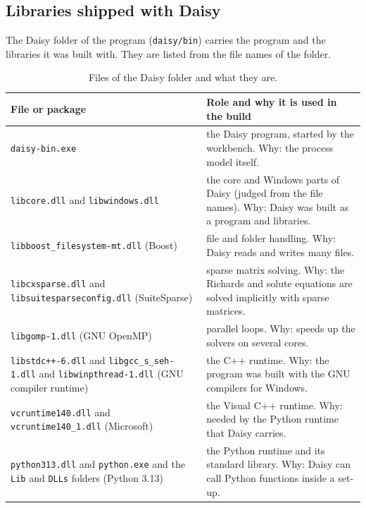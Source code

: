 \subsection{Libraries shipped with Daisy}
The Daisy folder of the program (\texttt{daisy/bin}) carries the program and the libraries it was built with. They are listed from the file names of the folder.
\begin{table}[H]\centering\small
\caption{Files of the Daisy folder and what they are.}\label{tab:daisydll}
\begin{tabular}{@{}>{\raggedright\arraybackslash}p{4.2cm}>{\raggedright\arraybackslash}p{8.8cm}@{}}
\toprule File or package & Role and why it is used in the build\\\midrule
\texttt{daisy-bin.exe} & the Daisy program, started by the workbench. Why: the process model itself.\\
\texttt{libcore.dll} and \texttt{libwindows.dll} & the core and Windows parts of Daisy (judged from the file names). Why: Daisy was built as a program and libraries.\\
\texttt{libboost\_filesystem-mt.dll} (Boost) & file and folder handling. Why: Daisy reads and writes many files.\\
\texttt{libcxsparse.dll} and \texttt{libsuitesparseconfig.dll} (SuiteSparse) & sparse matrix solving. Why: the Richards and solute equations are solved implicitly with sparse matrices.\\
\texttt{libgomp-1.dll} (GNU OpenMP) & parallel loops. Why: speeds up the solvers on several cores.\\
\texttt{libstdc++-6.dll} and \texttt{libgcc\_s\_seh-1.dll} and \texttt{libwinpthread-1.dll} (GNU compiler runtime) & the C++ runtime. Why: the program was built with the GNU compilers for Windows.\\
\texttt{vcruntime140.dll} and \texttt{vcruntime140\_1.dll} (Microsoft) & the Visual C++ runtime. Why: needed by the Python runtime that Daisy carries.\\
\texttt{python313.dll} and \texttt{python.exe} and the \texttt{Lib} and \texttt{DLLs} folders (Python 3.13) & the Python runtime and its standard library. Why: Daisy can call Python functions inside a set-up.\\
\bottomrule\end{tabular}\end{table}

